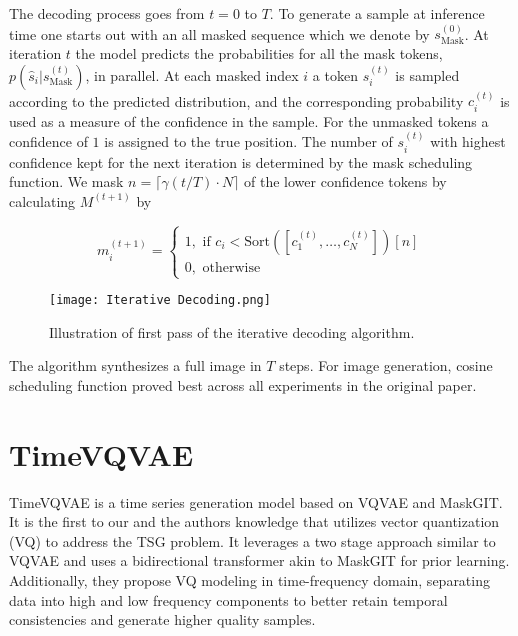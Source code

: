 \documentclass[../../thesis.tex]{subfiles}
\begin{document}
The decoding process goes from $t = 0$ to $T$. To generate a sample at inference time one starts out with an all masked sequence which we denote by $s_\text{Mask}^{(0)}$. At iteration $t$ the model predicts the probabilities for all the mask tokens, $p(\widehat{s}_i|s_\text{Mask}^{(t)})$, in parallel. At each masked index $i$ a token $s_i^{(t)}$ is sampled according to the predicted distribution, and the corresponding probability $c_i^{(t)}$ is used as a measure of the confidence in the sample. For the unmasked tokens a confidence of $1$ is assigned to the true position. The number of $s_i^{(t)}$ with highest confidence kept for the next iteration is determined by the mask scheduling function. We mask $n = \lceil \gamma(t/T)\cdot N \rceil$ of the lower confidence tokens by calculating $M^{(t+1)}$ by 

\begin{equation}
    m_i^{(t+1)} = 
    \begin{cases}
        1, \text{ if } c_i < \text{Sort}([c_1^{(t)},\dots,c_N^{(t)}])[n]\\
        0, \text{ otherwise} 
    \end{cases}
\end{equation}

\begin{figure}[h]
    \texttt{[image: Iterative Decoding.png]}
    \centering 
    \label{fig:IterativeDecoding}
    \caption{Illustration of first pass of the iterative decoding algorithm.}
\end{figure}

The algorithm synthesizes a full image in $T$ steps. For image generation, cosine scheduling function proved best across all experiments in the original paper.


\section{TimeVQVAE}

TimeVQVAE is a time series generation model based on VQVAE and MaskGIT. It is the first to our and the authors knowledge that utilizes vector quantization (VQ) to address the TSG problem. It leverages a two stage approach similar to VQVAE and uses a bidirectional transformer akin to MaskGIT for prior learning. Additionally, they propose VQ modeling in time-frequency domain, separating data into high and low frequency components to better retain temporal consistencies and generate higher quality samples.\newline
\end{document}

